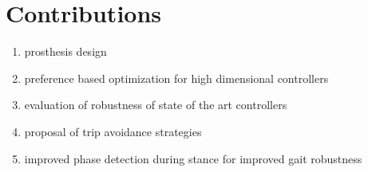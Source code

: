 \section{Contributions}\label{sec:intro_contributions} 

\begin{enumerate}
\item prosthesis design
\item preference based optimization for high dimensional controllers
\item evaluation of robustness of state of the art controllers
\item proposal of trip avoidance strategies
\item improved phase detection during stance for improved gait robustness
\end{enumerate}
